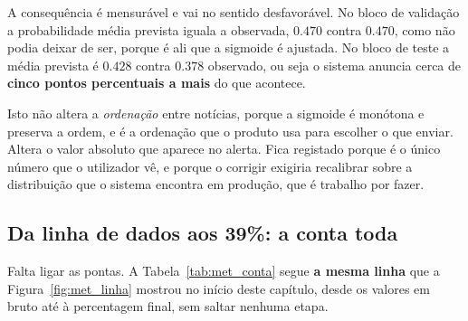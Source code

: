 A consequência é mensurável e vai no sentido desfavorável. No bloco de validação a probabilidade
média prevista iguala a observada, $0.470$ contra $0.470$, como não podia deixar de ser, porque é
ali que a sigmoide é ajustada. No bloco de teste a média prevista é $0.428$ contra $0.378$
observado, ou seja o sistema anuncia cerca de \textbf{cinco pontos percentuais a mais} do que
acontece.

Isto não altera a \emph{ordenação} entre notícias, porque a sigmoide é monótona e preserva a ordem,
e é a ordenação que o produto usa para escolher o que enviar. Altera o valor absoluto que aparece no
alerta. Fica registado porque é o único número que o utilizador vê, e porque o corrigir exigiria
recalibrar sobre a distribuição que o sistema encontra em produção, que é trabalho por fazer.

\subsection{Da linha de dados aos 39\%: a conta toda}
\label{sec:met_conta}

Falta ligar as pontas. A Tabela~\ref{tab:met_conta} segue \textbf{a mesma linha} que a
Figura~\ref{fig:met_linha} mostrou no início deste capítulo, desde os valores em bruto até à
percentagem final, sem saltar nenhuma etapa.

